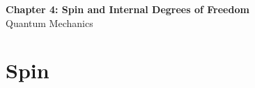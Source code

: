 \documentclass[12pt]{article}
\begin{document}
\begin{center}
  {\LARGE\bfseries Chapter 4: Spin and Internal Degrees of Freedom}\\[0.25em]
  {\large Quantum Mechanics}\\[0.15em]
\end{center}


\section{Spin}

\todo
\end{document}
